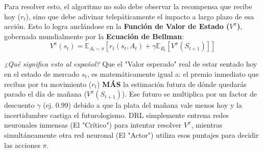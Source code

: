 \documentclass[11pt]{article}
\begin{document}
Para resolver esto, el algoritmo no solo debe observar la recompensa que recibe hoy ($r_t$), sino que debe adivinar telepáticamente el impacto a largo plazo de esa acción. Esto lo logra anclándose en la \textbf{Función de Valor de Estado ($V^\pi$)}, gobernada mundialmente por la \textbf{Ecuación de Bellman}:
\begin{equation}
    V^\pi(s_t) = \mathbb{E}_{A_t \sim \pi} \left[ r_t(s_t, A_t) + \gamma \mathbb{E}_{R_t} \left[ V^\pi(S_{t+1}) \right] \right]
\end{equation}

\textit{¿Qué significa esto al español?} Que el "Valor esperado" real de estar sentado hoy en el estado de mercado $s_t$, es matemáticamente igual a: el premio inmediato que recibas por tu movimiento ($r_t$) \textbf{MÁS} la estimación futura de dónde quedarás parado el día de mañana ($V^\pi(S_{t+1})$). Ese futuro se multiplica por un factor de descuento $\gamma$ (ej. 0.99) debido a que la plata del mañana vale menos hoy y la incertidumbre castiga el futurologismo. DRL simplemente entrena redes neuronales inmensas (El "Crítico") para intentar resolver $V^\pi$, mientras simultáneamente otra red neuronal (El "Actor") utiliza esos puntajes para decidir las acciones $\pi$.
\end{document}

